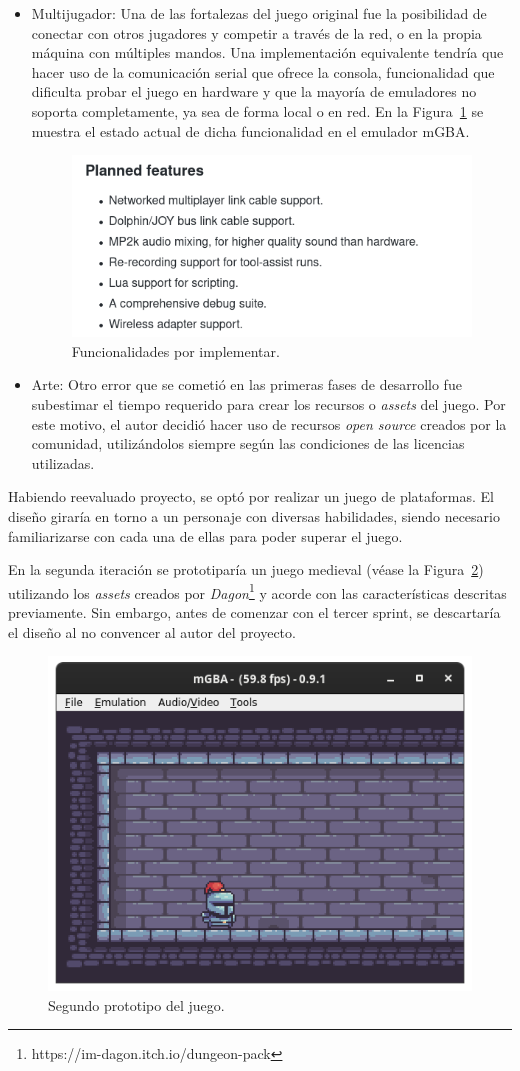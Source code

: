 \begin{itemize}
	\item Multijugador: Una de las fortalezas del juego original fue la posibilidad de conectar con otros jugadores y competir a través de la red, o en la propia máquina con múltiples mandos. Una implementación equivalente tendría que hacer uso de la comunicación serial que ofrece la consola, funcionalidad que dificulta probar el juego en hardware y que la mayoría de emuladores no soporta completamente, ya sea de forma local o en red. En la Figura~\ref{fig:mgba_serial_status} se muestra el estado actual de dicha funcionalidad en el emulador mGBA.

		\begin{figure}[h]
			\centering
			\includegraphics[width=.5\textwidth]{capitulos/capitulo5/mgba_serial_status.png}
			\caption{Funcionalidades por implementar.}\label{fig:mgba_serial_status}
		\end{figure}
		\FloatBarrier{}

	\item Arte: Otro error que se cometió en las primeras fases de desarrollo fue subestimar el tiempo requerido para crear los recursos o \textit{assets} del juego. Por este motivo, el autor decidió hacer uso de recursos \textit{open source} creados por la comunidad, utilizándolos siempre según las condiciones de las licencias utilizadas.
\end{itemize}

Habiendo reevaluado proyecto, se optó por realizar un juego de plataformas. El diseño giraría en torno a un personaje con diversas habilidades, siendo necesario familiarizarse con cada una de ellas para poder superar el juego.

En la segunda iteración se prototiparía un juego medieval (véase la Figura~\ref{fig:proto_2}) utilizando los \textit{assets} creados por \textit{Dagon}\footnote{https://im-dagon.itch.io/dungeon-pack} y acorde con las características descritas previamente. Sin embargo, antes de comenzar con el tercer sprint, se descartaría el diseño al no convencer al autor del proyecto.

\begin{figure}[h]
	\centering
	\includegraphics[width=.5\textwidth]{capitulos/capitulo5/proto_2.png}
	\caption{Segundo prototipo del juego.}\label{fig:proto_2}
\end{figure}
\FloatBarrier{}

